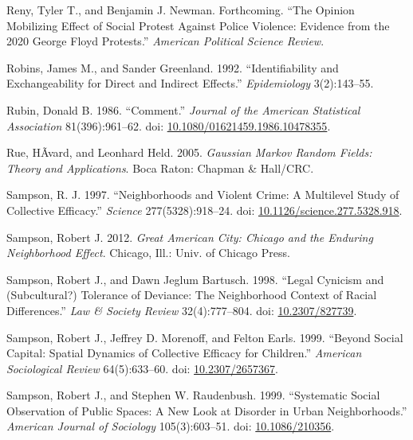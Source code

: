 \documentclass [11pt, proquest] {uwthesis}[2015/03/03]
\newlength{\cslhangindent}
\newenvironment{CSLReferences}[2]%
{\setlength{\parindent}{0pt}%
\everypar{\setlength{\hangindent}{\cslhangindent}}\ignorespaces}%
{\par}
\begin{document}
\begin{CSLReferences}{1}{0}
\leavevmode\hypertarget{ref-renyOpinionMobilizingEffectForthcoming}{}%
Reny, Tyler T., and Benjamin J. Newman. Forthcoming. {``The {Opinion Mobilizing Effect} of {Social Protest Against Police Violence}: {Evidence} from the 2020 {George Floyd Protests}.''} \emph{American Political Science Review}.

\leavevmode\hypertarget{ref-robinsIdentifiabilityExchangeabilityDirect1992}{}%
Robins, James M., and Sander Greenland. 1992. {``Identifiability and {Exchangeability} for {Direct} and {Indirect Effects}.''} \emph{Epidemiology} 3(2):143--55.

\leavevmode\hypertarget{ref-rubinComment1986}{}%
Rubin, Donald B. 1986. {``Comment.''} \emph{Journal of the American Statistical Association} 81(396):961--62. doi: \href{https://doi.org/10.1080/01621459.1986.10478355}{10.1080/01621459.1986.10478355}.

\leavevmode\hypertarget{ref-rueGaussianMarkovRandom2005}{}%
Rue, HÃvard, and Leonhard Held. 2005. \emph{Gaussian {Markov} Random Fields: Theory and Applications}. {Boca Raton}: {Chapman \& Hall/CRC}.

\leavevmode\hypertarget{ref-sampsonNeighborhoodsViolentCrime1997b}{}%
Sampson, R. J. 1997. {``Neighborhoods and {Violent Crime}: {A Multilevel Study} of {Collective Efficacy}.''} \emph{Science} 277(5328):918--24. doi: \href{https://doi.org/10.1126/science.277.5328.918}{10.1126/science.277.5328.918}.

\leavevmode\hypertarget{ref-sampsonGreatAmericanCity2012}{}%
Sampson, Robert J. 2012. \emph{Great {American City}: {Chicago} and the {Enduring Neighborhood Effect}}. {Chicago, Ill.}: {Univ. of Chicago Press}.

\leavevmode\hypertarget{ref-sampsonLegalCynicismSubcultural1998}{}%
Sampson, Robert J., and Dawn Jeglum Bartusch. 1998. {``Legal {Cynicism} and ({Subcultural}?) {Tolerance} of {Deviance}: {The Neighborhood Context} of {Racial Differences}.''} \emph{Law \& Society Review} 32(4):777--804. doi: \href{https://doi.org/10.2307/827739}{10.2307/827739}.

\leavevmode\hypertarget{ref-sampsonSocialCapitalSpatial1999}{}%
Sampson, Robert J., Jeffrey D. Morenoff, and Felton Earls. 1999. {``Beyond {Social Capital}: {Spatial Dynamics} of {Collective Efficacy} for {Children}.''} \emph{American Sociological Review} 64(5):633--60. doi: \href{https://doi.org/10.2307/2657367}{10.2307/2657367}.

\leavevmode\hypertarget{ref-sampsonSystematicSocialObservation1999}{}%
Sampson, Robert J., and Stephen W. Raudenbush. 1999. {``Systematic {Social Observation} of {Public Spaces}: {A New Look} at {Disorder} in {Urban Neighborhoods}.''} \emph{American Journal of Sociology} 105(3):603--51. doi: \href{https://doi.org/10.1086/210356}{10.1086/210356}.


\end{CSLReferences}
\end{document}
